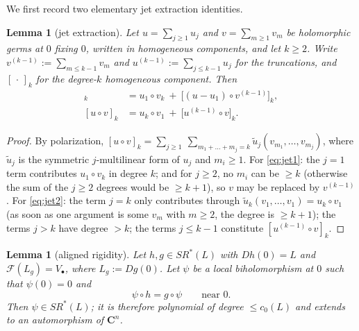 \documentclass[english,11pt]{amsart}
\newtheorem{lemma}[theorem]{Lemma}
\theoremstyle{definition}
\theoremstyle{remark}
\numberwithin{equation}{section}
\newcommand{\C}{\mathbf{C}}
\newcommand{\FF}{\mathcal{F}}
\begin{document}
We first record two elementary jet extraction identities.

\begin{lemma}[jet extraction]\label{l:jets}
Let $u=\sum_{j\ge1}u_j$ and $v=\sum_{m\ge1}v_m$ be holomorphic germs at $0$ fixing $0$, written in homogeneous components, and let $k\ge2$. Write $v^{(k-1)}:=\sum_{m\le k-1}v_m$ and $u^{(k-1)}:=\sum_{j\le k-1}u_j$ for the truncations, and $[\,\cdot\,]_k$ for the degree-$k$ homogeneous component. Then
\begin{align}
[u\circ v]_k&=u_1\circ v_k\ +\ \big[(u-u_1)\circ v^{(k-1)}\big]_k, \label{eq:jet1}\\
[u\circ v]_k&=u_k\circ v_1\ +\ \big[u^{(k-1)}\circ v\big]_k. \label{eq:jet2}
\end{align}
\end{lemma}

\begin{proof}
By polarization, $[u\circ v]_k=\sum_{j\ge1}\ \sum_{m_1+\dots+m_j=k}\widetilde u_j(v_{m_1},\dots,v_{m_j})$, where $\widetilde u_j$ is the symmetric $j$-multilinear form of $u_j$ and $m_i\ge1$. For \eqref{eq:jet1}: the $j=1$ term contributes $u_1\circ v_k$ in degree $k$; and for $j\ge2$, no $m_i$ can be $\ge k$ (otherwise the sum of the $j\ge2$ degrees would be $\ge k+1$), so $v$ may be replaced by $v^{(k-1)}$. For \eqref{eq:jet2}: the term $j=k$ only contributes through $\widetilde u_k(v_1,\dots,v_1)=u_k\circ v_1$ (as soon as one argument is some $v_m$ with $m\ge2$, the degree is $\ge k+1$); the terms $j>k$ have degree $>k$; the terms $j\le k-1$ constitute $[u^{(k-1)}\circ v]_k$.
\end{proof}

\begin{lemma}[aligned rigidity]\label{l:alignedrigidity}
Let $h,g\in SR^*(L)$ with $Dh(0)=L$ and $\FF(L_g)=V_\bullet$, where $L_g:=Dg(0)$. Let $\psi$ be a local biholomorphism at $0$ such that $\psi(0)=0$ and
\[
\psi\circ h=g\circ\psi\qquad\text{near }0 .
\]
Then $\psi\in SR^*(L)$; it is therefore polynomial of degree $\le c_0(L)$ and extends to an automorphism of $\C^n$.
\end{lemma}
\end{document}
